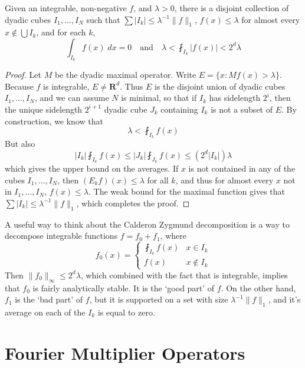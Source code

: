 \begin{theorem}
  Given an integrable, non-negative $f$, and $\lambda > 0$, there is a disjoint collection of dyadic cubes $I_1, \dots, I_N$ such that $\sum |I_k| \leq \lambda^{-1} \| f \|_1$, $f(x) \leq \lambda$ for almost every $x \not \in \bigcup I_k$, and for each $k$,
  \[ \int_{I_k} f(x)\; dx = 0 \quad \text{and} \quad \lambda < \fint_{I_k} |f(x)| < 2^d \lambda \]
\end{theorem}
\begin{proof}
  Let $M$ be the dyadic maximal operator. Write $E = \{ x: Mf(x) > \lambda \}$. Because $f$ is integrable, $E \neq \mathbf{R}^d$. Thus $E$ is the disjoint union of dyadic cubes $I_1, \dots, I_N$, and we can assume $N$ is minimal, so that if $I_k$ has sidelength $2^i$, then the unique sidelength $2^{i+1}$ dyadic cube $J_k$ containing $I_k$ is not a subset of $E$. By construction, we know that
  \[ \lambda < \fint_{I_k} f(x) \]
  But also
  \[ |I_k| \fint_{I_k} f(x) \leq |J_k| \fint_{J_k} f(x) \leq (2^d |I_k|) \lambda \]
  which gives the upper bound on the averages. If $x$ is not contained in any of the cubes $I_1, \dots, I_N$, then $(E_k f)(x) \leq \lambda$ for all $k$, and thus for almost every $x$ not in $I_1, \dots, I_N$, $f(x) \leq \lambda$. The weak bound for the maximal function gives that $\sum |I_k| \leq \lambda^{-1} \| f \|_1$, which completes the proof.
\end{proof}

A useful way to think about the Calderon Zygmund decomposition is a way to decompose integrable functions $f = f_0 + f_1$, where
%
\[ f_0(x) = \begin{cases} \fint_{I_k} f(x) & x \in I_k \\ f(x) & x \not \in I_k \end{cases} \]
%
Then $\| f_0 \|_\infty \leq 2^d \lambda$, which combined with the fact that is integrable, implies that $f_0$ is fairly analytically stable. It is the `good part' of $f$. On the other hand, $f_1$ is the `bad part' of $f$, but it is supported on a set with size $\lambda^{-1} \| f \|_1$, and it's average on each of the $I_k$ is equal to zero.




\chapter{Fourier Multiplier Operators}

